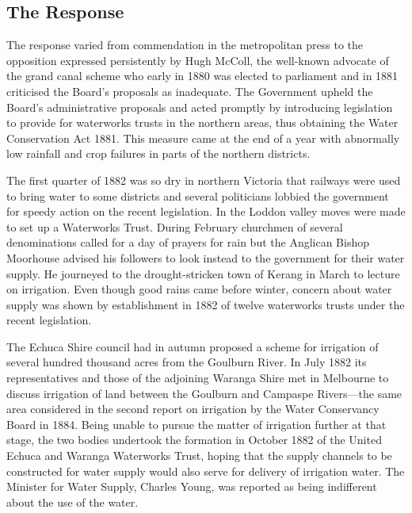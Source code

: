 \subsection*{The Response}

The response varied from commendation in the metropolitan press to the
opposition expressed persistently by Hugh McColl, the well-known
advocate of the grand canal scheme who early in 1880 was elected to
parliament and in 1881 criticised the Board's proposals as
inadequate.  The Government upheld the Board's administrative proposals
and acted promptly by introducing legislation to provide for
waterworks trusts in the northern areas, thus obtaining the Water
Conservation Act 1881.  This measure came at the end of a year with
abnormally low rainfall and crop failures in parts of the northern
districts.

The first quarter of 1882 was so dry in northern Victoria that
railways were used to bring water to some districts and several
politicians lobbied the government for speedy action on the recent
legislation.  In the Loddon valley moves were made to set up a
Waterworks Trust.  During February
churchmen of several denominations called for a day of prayers for
rain but the Anglican Bishop Moorhouse advised his followers to look
instead to the government for their water supply.  He journeyed to the
drought-stricken town of Kerang in March to lecture on irrigation.
Even though good rains came before winter, concern about water supply
was shown by establishment in 1882 of twelve waterworks trusts under
the recent legislation.

The Echuca Shire council had in autumn proposed a scheme for
irrigation of several hundred thousand acres from the Goulburn
River.  In July 1882 its
representatives and those of the adjoining Waranga Shire met in
Melbourne to discuss irrigation of land between the Goulburn and
Campaspe Rivers---the same area considered in the second report on
irrigation by the Water Conservancy Board in 1884.  Being unable to pursue
the matter of irrigation further at that stage, the two bodies
undertook the formation in October 1882 of the United Echuca and
Waranga Waterworks Trust, hoping that the supply channels to be
constructed for water supply would also serve for delivery of
irrigation water.  The
Minister for Water Supply, Charles Young, was reported as being
indifferent about the use of the water.

